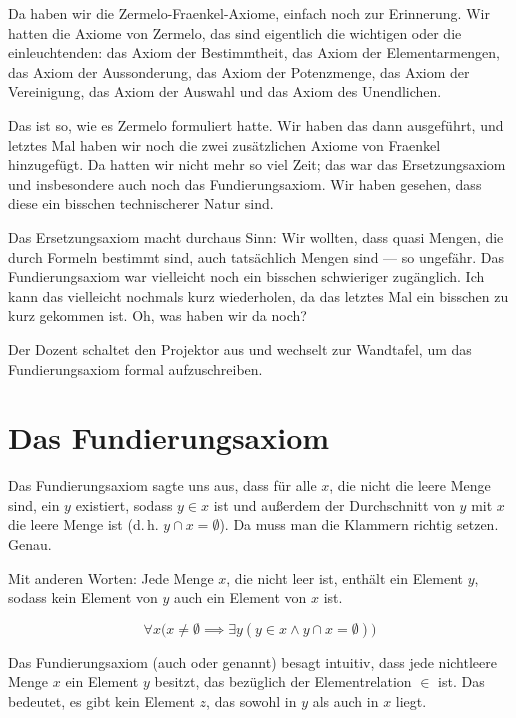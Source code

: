 \begin{spoken-clean}[00:03:45 - 00:04:30]
Da haben wir die Zermelo-Fraenkel-Axiome, einfach noch zur Erinnerung. Wir hatten die Axiome von Zermelo, das sind eigentlich die wichtigen oder die einleuchtenden: das Axiom der Bestimmtheit, das Axiom der Elementarmengen, das Axiom der Aussonderung, das Axiom der Potenzmenge, das Axiom der Vereinigung, das Axiom der Auswahl und das Axiom des Unendlichen.

Das ist so, wie es Zermelo formuliert hatte. Wir haben das dann ausgeführt, und letztes Mal haben wir noch die zwei zusätzlichen Axiome von Fraenkel hinzugefügt. Da hatten wir nicht mehr so viel Zeit; das war das Ersetzungsaxiom und insbesondere auch noch das Fundierungsaxiom. Wir haben gesehen, dass diese ein bisschen technischerer Natur sind.

Das Ersetzungsaxiom macht durchaus Sinn: Wir wollten, dass quasi Mengen, die durch Formeln bestimmt sind, auch tatsächlich Mengen sind --- so ungefähr. Das Fundierungsaxiom war vielleicht noch ein bisschen schwieriger zugänglich. Ich kann das vielleicht nochmals kurz wiederholen, da das letztes Mal ein bisschen zu kurz gekommen ist. Oh, was haben wir da noch?
\end{spoken-clean}

\begin{meta-note}[Tafelübergang]
Der Dozent schaltet den Projektor aus und wechselt zur Wandtafel, um das Fundierungsaxiom formal aufzuschreiben.
\end{meta-note}

\section{Das Fundierungsaxiom}

\begin{spoken-clean}[00:04:30 - 00:05:48]
Das Fundierungsaxiom sagte uns aus, dass für alle $x$, die nicht die leere Menge sind, ein $y$ existiert, sodass $y \in x$ ist und außerdem der Durchschnitt von $y$ mit $x$ die leere Menge ist (d.\,h. $y \cap x = \emptyset$). Da muss man die Klammern richtig setzen. Genau.

Mit anderen Worten: Jede Menge $x$, die nicht leer ist, enthält ein Element $y$, sodass kein Element von $y$ auch ein Element von $x$ ist.
\end{spoken-clean}

\begin{math-stroke}
\begin{axiom}[Fundierungsaxiom]\label{ax:fundierung}
\[ \forall x \bigl( x \neq \emptyset \implies \exists y (y \in x \land y \cap x = \emptyset) \bigr) \]
\end{axiom}

\begin{explanation-of-steps}
Das Fundierungsaxiom (auch  oder  genannt) besagt intuitiv, dass jede nichtleere Menge $x$ ein Element $y$ besitzt, das  bezüglich der Elementrelation $\in$ ist. Das bedeutet, es gibt kein Element $z$, das sowohl in $y$ als auch in $x$ liegt.
\end{explanation-of-steps}
\end{math-stroke}

